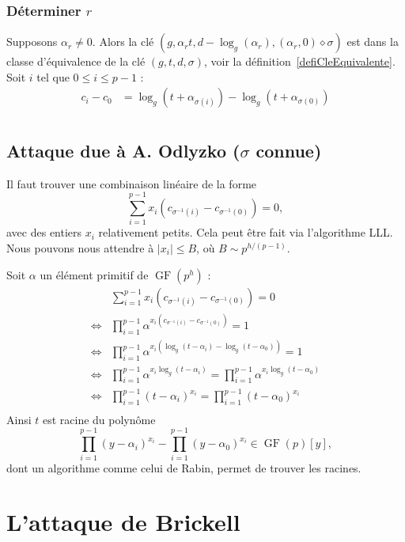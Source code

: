 \documentclass[a4paper, titlepage]{article}
\theoremstyle{definition}
\theoremstyle{remark}
\def\gf{\operatorname{GF}}
\begin{document}
\subsubsection*{Déterminer $r$} Supposons $\alpha_r \neq 0$. Alors la clé $(g,\alpha_rt,d-\log_g(\alpha_r),(\alpha_r,0) \diamond\sigma)$ est dans la classe d'équivalence de la clé $(g,t,d,\sigma)$, voir la définition~\ref{defiCleEquivalente}.\\
Soit $i$ tel que $0\leqslant i \leqslant p-1$ :
\begin{align*}
c_i - c_0 &= \log_g(t+\alpha_{\sigma(i)}) - \log_g(t+\alpha_{\sigma(0)})\\
\end{align*}

\subsection{Attaque due à A. Odlyzko ($\sigma$ connue)}

Il faut trouver une combinaison linéaire de la forme 
$$\sum_{i=1}^{p-1} x_i\left(c_{\sigma^{-1}(i)}-c_{\sigma^{-1}(0)}\right) = 0,$$
avec des entiers $x_i$ relativement petits. Cela peut être fait via l'algorithme LLL. Nous pouvons nous attendre à $|x_i| \leqslant B$, où $B \sim p^{h/(p-1)}$. 

Soit $\alpha$ un élément primitif de $\gf(p^h)$ :
\begin{align*}
& \sum_{i=1}^{p-1} x_i\left(c_{\sigma^{-1}(i)}-c_{\sigma^{-1}(0)}\right) = 0 \\
\Leftrightarrow & \prod_{i=1}^{p-1} \alpha^{x_i\left(c_{\sigma^{-1}(i)}-c_{\sigma^{-1}(0)}\right)} = 1 \\
\Leftrightarrow & \prod_{i=1}^{p-1} \alpha^{x_i(\log_g(t-\alpha_i)-\log_g(t-\alpha_0))} = 1 \\
\Leftrightarrow & \prod_{i=1}^{p-1} \alpha^{x_i\log_g(t-\alpha_i)} = \prod_{i=1}^{p-1} \alpha^{x_i\log_g(t-\alpha_0)}\\
\Leftrightarrow & \prod_{i=1}^{p-1} (t-\alpha_i)^{x_i} = \prod_{i=1}^{p-1} (t-\alpha_0)^{x_i}\\
\end{align*}
Ainsi $t$ est racine du polynôme
$$\prod_{i=1}^{p-1} (y-\alpha_i)^{x_i} - \prod_{i=1}^{p-1} (y-\alpha_0)^{x_i} \in \gf(p)[y],$$
dont un algorithme comme celui de Rabin,  permet de trouver les racines.

\section{L'attaque de Brickell}
\end{document}
